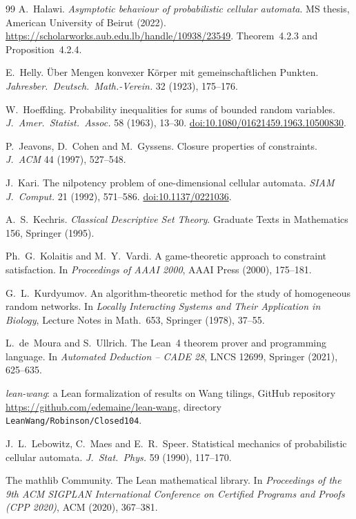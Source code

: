 \begin{thebibliography}{99}
 A.~Halawi. \emph{Asymptotic behaviour of probabilistic cellular automata}. MS thesis, American University of Beirut (2022). \url{https://scholarworks.aub.edu.lb/handle/10938/23549}. Theorem~4.2.3 and Proposition~4.2.4.

 E.~Helly. \"Uber Mengen konvexer K\"orper mit gemeinschaftlichen Punkten. \emph{Jahresber.\ Deutsch.\ Math.-Verein.} 32 (1923), 175--176.

 W.~Hoeffding. Probability inequalities for sums of bounded random variables. \emph{J.\ Amer.\ Statist.\ Assoc.} 58 (1963), 13--30. \href{https://doi.org/10.1080/01621459.1963.10500830}{doi:10.1080/01621459.1963.10500830}.

 P.~Jeavons, D.~Cohen and M.~Gyssens. Closure properties of constraints. \emph{J.\ ACM} 44 (1997), 527--548.

 J.~Kari. The nilpotency problem of one-dimensional cellular automata. \emph{SIAM J.\ Comput.} 21 (1992), 571--586. \href{https://doi.org/10.1137/0221036}{doi:10.1137/0221036}.

 A.~S.~Kechris. \emph{Classical Descriptive Set Theory}. Graduate Texts in Mathematics 156, Springer (1995).

 Ph.~G.~Kolaitis and M.~Y.~Vardi. A game-theoretic approach to constraint satisfaction. In \emph{Proceedings of AAAI 2000}, AAAI Press (2000), 175--181.

 G.~L.~Kurdyumov. An algorithm-theoretic method for the study of homogeneous random networks. In \emph{Locally Interacting Systems and Their Application in Biology}, Lecture Notes in Math.\ 653, Springer (1978), 37--55.

 L.~de~Moura and S.~Ullrich. The Lean~4 theorem prover and programming language. In \emph{Automated Deduction -- CADE 28}, LNCS 12699, Springer (2021), 625--635.

 \emph{lean-wang}: a Lean formalization of results on Wang tilings, GitHub repository \url{https://github.com/edemaine/lean-wang}, directory \texttt{LeanWang/Robinson/Closed104}.

 J.~L.~Lebowitz, C.~Maes and E.~R.~Speer. Statistical mechanics of probabilistic cellular automata. \emph{J.\ Stat.\ Phys.} 59 (1990), 117--170.

 The mathlib Community. The Lean mathematical library. In \emph{Proceedings of the 9th ACM SIGPLAN International Conference on Certified Programs and Proofs (CPP 2020)}, ACM (2020), 367--381.


\end{thebibliography}
